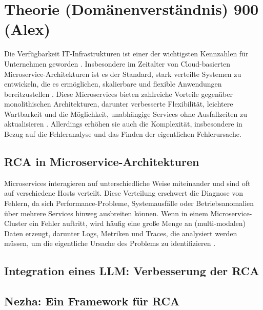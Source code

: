 \chapter{Theorie (Domänenverständnis) 900 (Alex)}
\label{sec:Theorie}

Die Verfügbarkeit IT-Infrastrukturen ist einer der wichtigsten Kennzahlen für Unternehmen geworden . Insbesondere im Zeitalter von Cloud-basierten Microservice-Architekturen ist es der Standard, stark verteilte Systemen zu entwickeln, die es ermöglichen, skalierbare und flexible Anwendungen bereitzustellen \autocite{Soldani2018}. Diese Microservices bieten zahlreiche Vorteile gegenüber monolithischen Architekturen, darunter verbesserte Flexibilität, leichtere Wartbarkeit und die Möglichkeit, unabhängige Services ohne Ausfallzeiten zu aktualisieren \autocite{Newman2019}. Allerdings erhöhen sie auch die Komplexität, insbesondere in Bezug auf die Fehleranalyse und das Finden der eigentlichen Fehlerursache.

\section{RCA in Microservice-Architekturen}
\label{sec:RCA in Microservice-Architekturen}

Microservices interagieren auf unterschiedliche Weise miteinander und sind oft auf verschiedene Hosts verteilt. Diese Verteilung erschwert die Diagnose von Fehlern, da sich Performance-Probleme, Systemausfälle oder Betriebsanomalien über mehrere Services hinweg ausbreiten können. Wenn in einem Microservice-Cluster ein Fehler auftritt, wird häufig eine große Menge an (multi-modalen) Daten erzeugt, darunter Logs, Metriken und Traces, die analysiert werden müssen, um die eigentliche Ursache des Problems zu identifizieren \autocite{nezha} .



\section{Integration eines LLM: Verbesserung der RCA}


\section{Nezha: Ein Framework für RCA}


